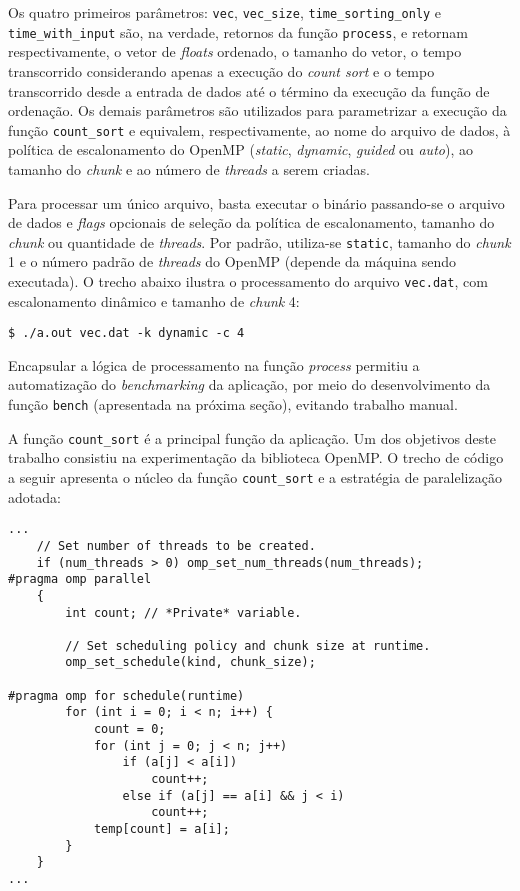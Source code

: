 \documentclass[12pt,a4paper]{article}
\begin{document}
Os quatro primeiros parâmetros: \texttt{vec}, \texttt{vec\_size},
\texttt{time\_sorting\_only} e \texttt{time\_with\_input} são, na verdade, retornos
da função \texttt{process}, e retornam respectivamente, o vetor de
\textit{floats} ordenado, o tamanho do vetor, o tempo transcorrido considerando
apenas a execução do \textit{count sort} e o tempo transcorrido desde a entrada
de dados até o término da execução da função de ordenação. Os demais parâmetros
são utilizados para parametrizar a execução da função \texttt{count\_sort} e
equivalem, respectivamente, ao nome do arquivo de dados, à política de
escalonamento do OpenMP (\textit{static}, \textit{dynamic}, \textit{guided} ou
\textit{auto}), ao tamanho do \textit{chunk} e ao número de \textit{threads} a
serem criadas.

Para processar um único arquivo, basta executar o binário passando-se o arquivo
de dados e \textit{flags} opcionais de seleção da política de escalonamento,
tamanho do \textit{chunk} ou quantidade de \textit{threads}. Por padrão,
utiliza-se \texttt{static}, tamanho do \textit{chunk} 1 e o número padrão de
\textit{threads} do OpenMP (depende da máquina sendo executada). O trecho
abaixo ilustra o processamento do arquivo \texttt{vec.dat}, com escalonamento
dinâmico e tamanho de \textit{chunk} 4:

\begin{verbatim}
$ ./a.out vec.dat -k dynamic -c 4
\end{verbatim}

Encapsular a lógica de processamento na função \textit{process} permitiu a
automatização do \textit{benchmarking} da aplicação, por meio do desenvolvimento
da função \texttt{bench} (apresentada na próxima seção), evitando trabalho
manual.

A função \texttt{count\_sort} é a principal função da aplicação. Um dos
objetivos deste trabalho consistiu na experimentação da biblioteca OpenMP\@. O
trecho de código a seguir apresenta o núcleo da função \texttt{count\_sort} e a
estratégia de paralelização adotada:

\begin{verbatim}
...
    // Set number of threads to be created.
    if (num_threads > 0) omp_set_num_threads(num_threads);
#pragma omp parallel
    {
        int count; // *Private* variable.

        // Set scheduling policy and chunk size at runtime.
        omp_set_schedule(kind, chunk_size);

#pragma omp for schedule(runtime)
        for (int i = 0; i < n; i++) {
            count = 0;
            for (int j = 0; j < n; j++)
                if (a[j] < a[i])
                    count++;
                else if (a[j] == a[i] && j < i)
                    count++;
            temp[count] = a[i];
        }
    }
...
\end{verbatim}
\end{document}
